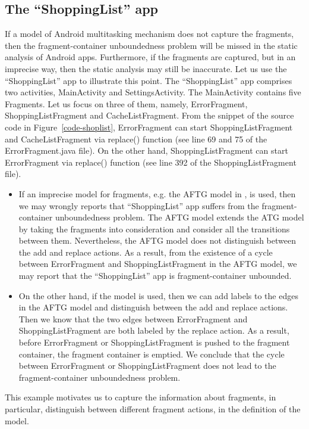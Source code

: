 \subsection{The ``ShoppingList'' app}
If a model of Android multitasking mechanism does not capture the fragments, then the fragment-container unboundedness problem will be missed in the static analysis of Android apps. 
Furthermore, if the fragments are captured, but in an imprecise way, then the static analysis may still be inaccurate. Let us use the ``ShoppingList'' app to illustrate this point. 
The ``ShoppingList'' app comprises two activities, MainActivity and SettingsActivity. The MainActivity contains five Fragments. Let us focus on three of them, namely, ErrorFragment, ShoppingListFragment and CacheListFragment. From the snippet of the source code in Figure~\ref{code-shoplist}, ErrorFragment can start ShoppingListFragment and CacheListFragment via replace() function (see line 69 and 75 of the ErrorFragment.java file). On the other hand, ShoppingListFragment can start ErrorFragment via replace() function (see line 392 of the ShoppingListFragment file). 
%
\begin{itemize}
\item If an imprecise model for fragments, e.g. the AFTG model in \cite{CHGD18}, is used, then we may wrongly reports that ``ShoppingList'' app suffers from the fragment-container unboundedness problem. The AFTG model extends the ATG model by taking the fragments into consideration and consider all the transitions between them. Nevertheless, the AFTG model does not distinguish between the add and replace actions. As a result, from the existence of a cycle between ErrorFragment and ShoppingListFragment in the AFTG model, we may report that the ``ShoppingList'' app is fragment-container unbounded. 
%
\item On the other hand, if the {\AMASS} model is used, then we can add labels to the edges in the AFTG model and distinguish between the add and replace actions. Then we know that the two edges between ErrorFragment and ShoppingListFragment are both labeled by the replace action. As a result, before ErrorFragment or ShoppingListFragment is pushed to the fragment container, the fragment container is emptied. We conclude that the cycle between ErrorFragment or ShoppingListFragment does not lead to the fragment-container unboundedness problem. 
\end{itemize}
This example motivates us to capture the information about fragments, in particular, distinguish between different fragment actions, in the definition of the {\AMASS} model.

